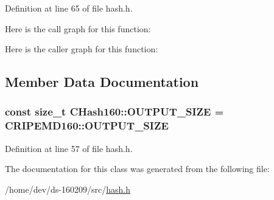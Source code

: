 Definition at line 65 of file hash.\+h.



Here is the call graph for this function\+:




Here is the caller graph for this function\+:




\subsection{Member Data Documentation}
\hypertarget{class_c_hash160_a1a5618e17d91ea96e86d779f575211eb}{}
\subsubsection[{O\+U\+T\+P\+U\+T\+\_\+\+S\+I\+Z\+E}]{\setlength{\rightskip}{0pt plus 5cm}const size\+\_\+t C\+Hash160\+::\+O\+U\+T\+P\+U\+T\+\_\+\+S\+I\+Z\+E = C\+R\+I\+P\+E\+M\+D160\+::\+O\+U\+T\+P\+U\+T\+\_\+\+S\+I\+Z\+E\hspace{0.3cm}{\ttfamily [static]}}\label{class_c_hash160_a1a5618e17d91ea96e86d779f575211eb}


Definition at line 57 of file hash.\+h.



The documentation for this class was generated from the following file\+:\begin{DoxyCompactItemize}
\item 
/home/dev/ds-\/160209/src/\hyperlink{hash_8h}{hash.\+h}\end{DoxyCompactItemize}

